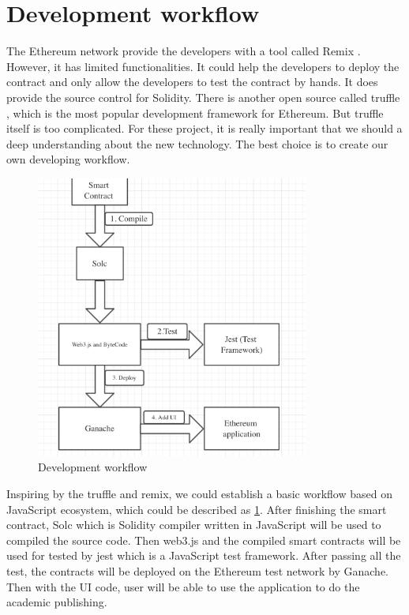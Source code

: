 \documentclass[openany,12pt]{ecsthesis}      %
\begin{document}
\section{Development workflow}
The Ethereum network provide the developers with a tool called Remix \cite{remix}. 
However, it has limited functionalities. 
It could help the developers to deploy the contract and only allow the developers to test the contract by hands.
It does provide the source control for Solidity. There is another open source called truffle \cite{truffle}, 
which is the most popular development framework for Ethereum. But truffle itself is too complicated. For these project, 
it is really important that we should a deep understanding about the new technology. The best choice is to create our own developing workflow.
\begin{figure}[H]
  \centering
  \includegraphics[width=0.8\textwidth]{developWorkFlow.png}
  \caption{Development workflow}
  \label{develop} 
\end{figure}
Inspiring by the truffle and remix, we could establish a basic workflow based on JavaScript ecosystem, which could be described as \ref{develop}.
After finishing the smart contract, Solc \cite{solc} which is Solidity compiler written in JavaScript will be used to compiled the source code.
Then web3.js and the compiled smart contracts will be used for tested by jest which is a JavaScript test framework. 
After passing all the test, the contracts will be deployed on the Ethereum test network by Ganache.
Then with the UI code, user will be able to use the application to do the academic publishing.
\end{document}
